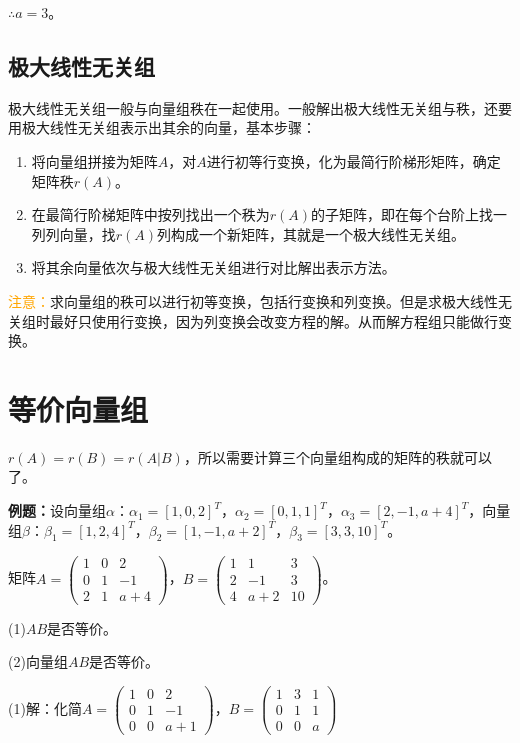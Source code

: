 \documentclass[UTF8, 12pt]{ctexart}
\begin{document}
$\therefore a=3$。

\subsection{极大线性无关组}

极大线性无关组一般与向量组秩在一起使用。一般解出极大线性无关组与秩，还要用极大线性无关组表示出其余的向量，基本步骤：

\begin{enumerate}
    \item 将向量组拼接为矩阵$A$，对$A$进行初等行变换，化为最简行阶梯形矩阵，确定矩阵秩$r(A)$。
    \item 在最简行阶梯矩阵中按列找出一个秩为$r(A)$的子矩阵，即在每个台阶上找一列列向量，找$r(A)$列构成一个新矩阵，其就是一个极大线性无关组。
    \item 将其余向量依次与极大线性无关组进行对比解出表示方法。
\end{enumerate}

\textcolor{orange}{注意：}求向量组的秩可以进行初等变换，包括行变换和列变换。但是求极大线性无关组时最好只使用行变换，因为列变换会改变方程的解。从而解方程组只能做行变换。

\section{等价向量组}

$r(A)=r(B)=r(A|B)$，所以需要计算三个向量组构成的矩阵的秩就可以了。

\textbf{例题：}设向量组$\alpha$：$\alpha_1=[1,0,2]^T$，$\alpha_2=[0,1,1]^T$，$\alpha_3=[2,-1,a+4]^T$，向量组$\beta$：$\beta_1=[1,2,4]^T$，$\beta_2=[1,-1,a+2]^T$，$\beta_3=[3,3,10]^T$。

矩阵$A=\left(\begin{array}{ccc}
    1 & 0 & 2 \\
    0 & 1 & -1 \\
    2 & 1 & a+4
\end{array}\right)$，$B=\left(\begin{array}{ccc}
    1 & 1 & 3 \\
    2 & -1 & 3 \\
    4 & a+2 & 10
\end{array}\right)$。\medskip

(1)$AB$是否等价。

(2)向量组$AB$是否等价。

(1)解：化简$A=\left(\begin{array}{ccc}
    1 & 0 & 2 \\
    0 & 1 & -1 \\
    0 & 0 & a+1
\end{array}\right)$，$B=\left(\begin{array}{ccc}
    1 & 3 & 1 \\
    0 & 1 & 1 \\
    0 & 0 & a
\end{array}\right)$
\end{document}
